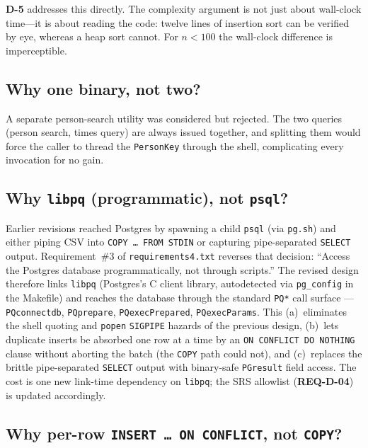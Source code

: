 \documentclass[12pt]{article}
\newcommand{\code}[1]{\texttt{#1}}
\newcommand{\req}[1]{\textbf{#1}}
\begin{document}
\begin{description}[style=nextline]
\req{D-5} addresses this directly.  The complexity argument is
not just about wall-clock time---it is about reading the code:
twelve lines of insertion sort can be verified by eye, whereas a
heap sort cannot.  For $n < 100$ the wall-clock difference is
imperceptible.

\subsection{Why one binary, not two?}

A separate person-search utility was considered but rejected.
The two queries (person search, times query) are always issued
together, and splitting them would force the caller to thread
the \code{PersonKey} through the shell, complicating every
invocation for no gain.

\subsection{Why \texttt{libpq} (programmatic), not \texttt{psql}?}

Earlier revisions reached Postgres by spawning a child
\texttt{psql} (via \texttt{pg.sh}) and either piping CSV into
\texttt{COPY \dots\ FROM~STDIN} or capturing pipe-separated
\texttt{SELECT} output.  Requirement~\#3 of
\texttt{requirements4.txt} reverses that decision: ``Access the
Postgres database programmatically, not through scripts.''  The
revised design therefore links \texttt{libpq} (Postgres's C
client library, autodetected via \texttt{pg\_config} in the
Makefile) and reaches the database through the standard
\code{PQ*} call surface --- \code{PQconnectdb},
\code{PQprepare}, \code{PQexecPrepared}, \code{PQexecParams}.
This (a)~eliminates the shell quoting and \texttt{popen}
\texttt{SIGPIPE} hazards of the previous design,
(b)~lets duplicate inserts be absorbed one row at a time by an
\texttt{ON~CONFLICT~DO~NOTHING} clause without aborting the
batch (the \texttt{COPY} path could not), and (c)~replaces the
brittle pipe-separated \texttt{SELECT} output with binary-safe
\code{PGresult} field access.  The cost is one new link-time
dependency on \code{libpq}; the SRS allowlist (\req{REQ-D-04})
is updated accordingly.

\subsection{Why per-row \texttt{INSERT \dots\ ON~CONFLICT}, not \texttt{COPY}?}


\end{description}
\end{document}
